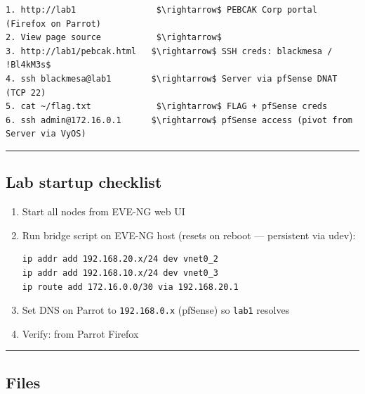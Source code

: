 \begin{lstlisting}
1. http://lab1                $\rightarrow$ PEBCAK Corp portal (Firefox on Parrot)
2. View page source           $\rightarrow$ 
3. http://lab1/pebcak.html   $\rightarrow$ SSH creds: blackmesa / !Bl4kM3s$
4. ssh blackmesa@lab1        $\rightarrow$ Server via pfSense DNAT (TCP 22)
5. cat ~/flag.txt             $\rightarrow$ FLAG + pfSense creds
6. ssh admin@172.16.0.1      $\rightarrow$ pfSense access (pivot from Server via VyOS)
\end{lstlisting}

\begin{center}\rule{0.5\linewidth}{0.5pt}\end{center}

\subsection{Lab startup checklist}

\begin{enumerate}
\def\labelenumi{\arabic{enumi}.}
\item
  Start all nodes from EVE-NG web UI
\item
  Run bridge script on EVE-NG host (resets on reboot --- persistent via udev):

\begin{lstlisting}
ip addr add 192.168.20.x/24 dev vnet0_2
ip addr add 192.168.10.x/24 dev vnet0_3
ip route add 172.16.0.0/30 via 192.168.20.1
\end{lstlisting}
\item
  Set DNS on Parrot to \texttt{192.168.0.x} (pfSense) so \texttt{lab1} resolves
\item
  Verify:  from Parrot Firefox
\end{enumerate}

\begin{center}\rule{0.5\linewidth}{0.5pt}\end{center}

\subsection{Files}

